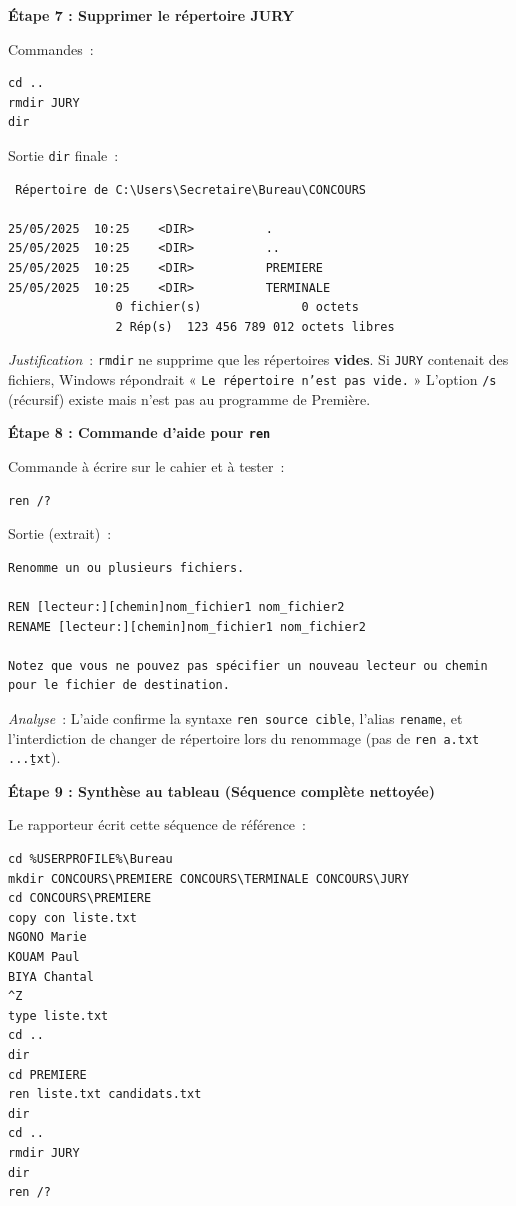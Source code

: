\documentclass[11pt]{article}
\begin{document}
\begin{exoresolu}
\textbf{Étape 7 : Supprimer le répertoire JURY}\par
\noindent
Commandes~:
\begin{lstlisting}
cd ..
rmdir JURY
dir
\end{lstlisting}
\noindent
Sortie \texttt{dir} finale~:
\begin{lstlisting}
 Répertoire de C:\Users\Secretaire\Bureau\CONCOURS

25/05/2025  10:25    <DIR>          .
25/05/2025  10:25    <DIR>          ..
25/05/2025  10:25    <DIR>          PREMIERE
25/05/2025  10:25    <DIR>          TERMINALE
               0 fichier(s)              0 octets
               2 Rép(s)  123 456 789 012 octets libres
\end{lstlisting}
\noindent
\emph{Justification}~: \texttt{rmdir} ne supprime que les répertoires \textbf{vides}. Si \texttt{JURY} contenait des fichiers, Windows répondrait « \texttt{Le répertoire n'est pas vide.} » L'option \texttt{/s} (récursif) existe mais n'est pas au programme de Première.

\textbf{Étape 8 : Commande d'aide pour \texttt{ren}}\par
\noindent
Commande à écrire sur le cahier et à tester~:
\begin{lstlisting}
ren /?
\end{lstlisting}
\noindent
Sortie (extrait)~:
\begin{lstlisting}
Renomme un ou plusieurs fichiers.

REN [lecteur:][chemin]nom_fichier1 nom_fichier2
RENAME [lecteur:][chemin]nom_fichier1 nom_fichier2

Notez que vous ne pouvez pas spécifier un nouveau lecteur ou chemin
pour le fichier de destination.
\end{lstlisting}
\noindent
\emph{Analyse}~: L'aide confirme la syntaxe \texttt{ren source cible}, l'alias \texttt{rename}, et l'interdiction de changer de répertoire lors du renommage (pas de \texttt{ren a.txt ..\b.txt}).

\textbf{Étape 9 : Synthèse au tableau (Séquence complète nettoyée)}\par
\noindent
Le rapporteur écrit cette séquence de référence~:
\begin{lstlisting}
cd %USERPROFILE%\Bureau
mkdir CONCOURS\PREMIERE CONCOURS\TERMINALE CONCOURS\JURY
cd CONCOURS\PREMIERE
copy con liste.txt
NGONO Marie
KOUAM Paul
BIYA Chantal
^Z
type liste.txt
cd ..
dir
cd PREMIERE
ren liste.txt candidats.txt
dir
cd ..
rmdir JURY
dir
ren /?
\end{lstlisting}
\end{exoresolu}
\end{document}
